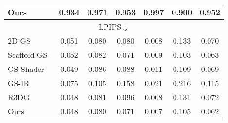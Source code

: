 \begin{table}
{\begin{tabular}{lcccccc}
Ours & \cellcolor{yzysecond}0.934                         & \cellcolor{yzysecond}0.971                          & \cellcolor{yzybest}0.953                            & \cellcolor{yzybest}0.997                           & \cellcolor{yzysecond}0.900                             &  \cellcolor{yzybest}0.952                                                                                                                                                                                              
 \\ \hline
 
\multicolumn{7}{c}{LPIPS$\downarrow$}                                                                                                                                                                                                                                              \\ \hline
2D-GS~\cite{Huang2DGS2024}        & \cellcolor{yzythird}0.051                     & \cellcolor{yzybest}0.080                     & \cellcolor{yzysecond}0.080                   & \cellcolor{yzysecond}0.008                   & 0.133       &  0.070                      \\

Scaffold-GS~\cite{lu2024scaffold}      & 0.052                     & \cellcolor{yzythird}0.082                     & \cellcolor{yzybest}0.071                 & \cellcolor{yzythird}0.009                  & \cellcolor{yzybest}0.103              & \cellcolor{yzysecond}0.063                  \\

GS-Shader~\cite{jiang2024gaussianshader}    &\cellcolor{yzysecond}0.049                     & 0.086                     & \cellcolor{yzythird}0.088                    & 0.011                   & \cellcolor{yzythird}0.109                        &  \cellcolor{yzythird}0.069                        \\

GS-IR~\cite{liang2024gs}  & 0.075 & 0.105 & 0.158 & 0.021 & 0.216 & 0.115   \\

R3DG~\cite{gao2023relightable}    &  \cellcolor{yzybest}0.048                    & \cellcolor{yzysecond}0.081                    &   0.096                 &  \cellcolor{yzysecond}0.008                  &  0.131                     &  0.072                                                                                                                                                             \\

Ours & \cellcolor{yzybest}0.048                          & \cellcolor{yzybest}0.080                          & \cellcolor{yzybest}0.071                  & \cellcolor{yzybest}0.007                        &  \cellcolor{yzysecond}0.105          & \cellcolor{yzybest}0.062                                                                                                 
 \\ \hline
\end{tabular}
}
\label{tab:tab_shiny}
      \vspace{-2ex}
\end{table}